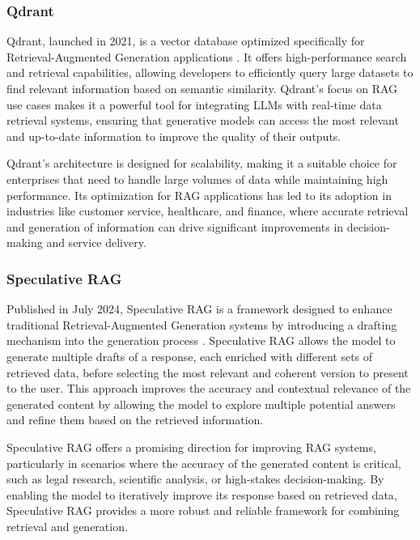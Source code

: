 \subsubsection{Qdrant}

Qdrant, launched in 2021, is a vector database optimized specifically for Retrieval-Augmented Generation applications \cite{Qdrant}. 
It offers high-performance search and retrieval capabilities, allowing developers to efficiently query large datasets to find relevant information based on semantic similarity. 
Qdrant's focus on RAG use cases makes it a powerful tool for integrating LLMs with real-time data retrieval systems, ensuring that generative models can access the most relevant and up-to-date information to improve the quality of their outputs.

Qdrant's architecture is designed for scalability, making it a suitable choice for enterprises that need to handle large volumes of data while maintaining high performance. 
Its optimization for RAG applications has led to its adoption in industries like customer service, healthcare, and finance, where accurate retrieval and generation of information can drive significant improvements in decision-making and service delivery.

\subsubsection{Speculative RAG}

Published in July 2024, Speculative RAG is a framework designed to enhance traditional Retrieval-Augmented Generation systems by introducing a drafting mechanism into the generation process \cite{SpeculativeRAG}. 
Speculative RAG allows the model to generate multiple drafts of a response, each enriched with different sets of retrieved data, before selecting the most relevant and coherent version to present to the user. 
This approach improves the accuracy and contextual relevance of the generated content by allowing the model to explore multiple potential answers and refine them based on the retrieved information.

Speculative RAG offers a promising direction for improving RAG systems, particularly in scenarios where the accuracy of the generated content is critical, such as legal research, scientific analysis, or high-stakes decision-making. 
By enabling the model to iteratively improve its response based on retrieved data, Speculative RAG provides a more robust and reliable framework for combining retrieval and generation.

